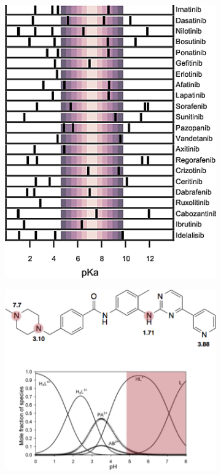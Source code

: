\documentclass[10pt,final]{article}
\begin{document}
\begin{figure}[H]
\centering
\begin{subfigure}{.48\textwidth}
  \centering
	\includegraphics[width=0.8\linewidth]{figures/inhibitor-pKas.png}
	\caption{}
	\label{figure:pka-kinase}
\end{subfigure}%
\hfill{}
\begin{subfigure}{.48\textwidth}
  \centering  
  \includegraphics[width=0.9\linewidth]{figures/imatinib_image_curve.png}

\end{subfigure}
\end{figure}
\end{document}
